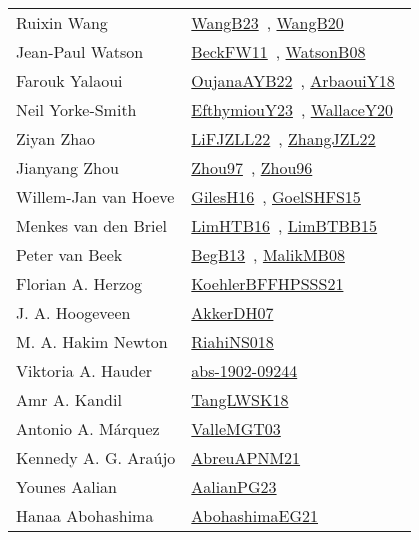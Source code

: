 {\begin{longtable}{p{4cm}p{20cm}}
Ruixin Wang & \href{works/WangB23.pdf}{WangB23}~\cite{WangB23}, \href{works/WangB20.pdf}{WangB20}~\cite{WangB20}\\
Jean{-}Paul Watson & \href{works/BeckFW11.pdf}{BeckFW11}~\cite{BeckFW11}, \href{works/WatsonB08.pdf}{WatsonB08}~\cite{WatsonB08}\\
Farouk Yalaoui & \href{works/OujanaAYB22.pdf}{OujanaAYB22}~\cite{OujanaAYB22}, \href{works/ArbaouiY18.pdf}{ArbaouiY18}~\cite{ArbaouiY18}\\
Neil Yorke{-}Smith & \href{works/EfthymiouY23.pdf}{EfthymiouY23}~\cite{EfthymiouY23}, \href{works/WallaceY20.pdf}{WallaceY20}~\cite{WallaceY20}\\
Ziyan Zhao & \href{works/LiFJZLL22.pdf}{LiFJZLL22}~\cite{LiFJZLL22}, \href{works/ZhangJZL22.pdf}{ZhangJZL22}~\cite{ZhangJZL22}\\
Jianyang Zhou & \href{works/Zhou97.pdf}{Zhou97}~\cite{Zhou97}, \href{works/Zhou96.pdf}{Zhou96}~\cite{Zhou96}\\
Willem{-}Jan van Hoeve & \href{works/GilesH16.pdf}{GilesH16}~\cite{GilesH16}, \href{works/GoelSHFS15.pdf}{GoelSHFS15}~\cite{GoelSHFS15}\\
Menkes van den Briel & \href{works/LimHTB16.pdf}{LimHTB16}~\cite{LimHTB16}, \href{works/LimBTBB15.pdf}{LimBTBB15}~\cite{LimBTBB15}\\
Peter van Beek & \href{works/BegB13.pdf}{BegB13}~\cite{BegB13}, \href{works/MalikMB08.pdf}{MalikMB08}~\cite{MalikMB08}\\
Florian A. Herzog & \href{works/KoehlerBFFHPSSS21.pdf}{KoehlerBFFHPSSS21}~\cite{KoehlerBFFHPSSS21}\\
J. A. Hoogeveen & \href{works/AkkerDH07.pdf}{AkkerDH07}~\cite{AkkerDH07}\\
M. A. Hakim Newton & \href{works/RiahiNS018.pdf}{RiahiNS018}~\cite{RiahiNS018}\\
Viktoria A. Hauder & \href{works/abs-1902-09244.pdf}{abs-1902-09244}~\cite{abs-1902-09244}\\
Amr A. Kandil & \href{works/TangLWSK18.pdf}{TangLWSK18}~\cite{TangLWSK18}\\
Antonio A. M{\'{a}}rquez & \href{works/ValleMGT03.pdf}{ValleMGT03}~\cite{ValleMGT03}\\
Kennedy A. G. Ara{\'u}jo & \href{works/AbreuAPNM21.pdf}{AbreuAPNM21}~\cite{AbreuAPNM21}\\
Younes Aalian & \href{works/AalianPG23.pdf}{AalianPG23}~\cite{AalianPG23}\\
Hanaa Abohashima & \href{works/AbohashimaEG21.pdf}{AbohashimaEG21}~\cite{AbohashimaEG21}\\

\end{longtable}}
